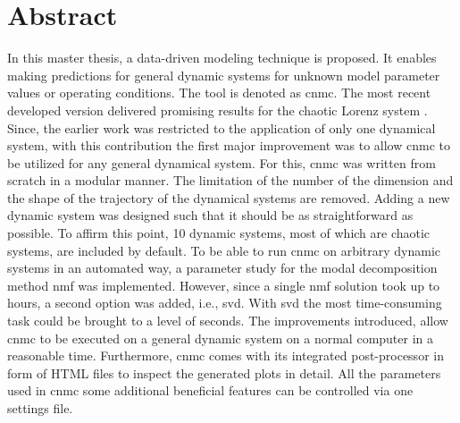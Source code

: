\chapter*{Abstract}
In this master thesis, a data-driven modeling technique is proposed. 
It enables making predictions for general dynamic systems for unknown model parameter values or operating conditions.
The tool is denoted as \gls{cnmc}.
The most recent developed version delivered promising results for the chaotic Lorenz system \cite{lorenz1963deterministic}.
Since, the earlier work was restricted to the application of only one dynamical system, with this contribution the first major improvement was to allow \gls{cnmc} to be utilized for any general dynamical system. 
For this, \gls{cnmc} was written from scratch in a modular manner. 
The limitation of the number of the dimension and the shape of the trajectory of the dynamical systems are removed.
Adding a new dynamic system was designed such that it should be as straightforward as possible. 
To affirm this point, 10 dynamic systems, most of which are chaotic systems, are included by default. 
To be able to run \gls{cnmc} on arbitrary dynamic systems in an automated way, a parameter study for the modal decomposition method \gls{nmf} was implemented.
However, since a single \gls{nmf} solution took up to hours, a second option was added, i.e., \gls{svd}. 
With \gls{svd} the most time-consuming task could be brought to a level of seconds.
The improvements introduced, allow \gls{cnmc} to be executed on a general dynamic system on a normal computer in a reasonable time. 
Furthermore, \gls{cnmc} comes with its integrated post-processor in form of HTML files to inspect the generated plots in detail.
All the parameters used in \gls{cnmc} some additional beneficial features can be controlled via one settings file. 
